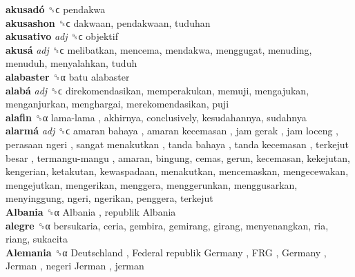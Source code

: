 \textbf{akusadó} ␝ϲ  pendakwa  \\
\textbf{akusashon} ␝ϲ  dakwaan, pendakwaan, tuduhan  \\
\textbf{akusativo} \emph{adj}  ␝ϲ  objektif  \\
\textbf{akusá} \emph{adj}  ␝ϲ  melibatkan, mencema, mendakwa, menggugat, menuding, menuduh, menyalahkan, tuduh  \\
\textbf{alabaster} ␝α   batu alabaster   \\
\textbf{alabá} \emph{adj}  ␝ϲ  direkomendasikan, memperakukan, memuji, mengajukan, menganjurkan, menghargai, merekomendasikan, puji  \\
\textbf{alafin} ␝α   lama-lama , akhirnya, conclusively, kesudahannya, sudahnya  \\
\textbf{alarmá} \emph{adj}  ␝ϲ   amaran bahaya ,  amaran kecemasan ,  jam gerak ,  jam loceng ,  perasaan ngeri ,  sangat menakutkan ,  tanda bahaya ,  tanda kecemasan ,  terkejut besar ,  termangu-mangu , amaran, bingung, cemas, gerun, kecemasan, kekejutan, kengerian, ketakutan, kewaspadaan, menakutkan, mencemaskan, mengecewakan, mengejutkan, mengerikan, menggera, menggerunkan, menggusarkan, menyinggung, ngeri, ngerikan, penggera, terkejut  \\
\textbf{Albania} ␝α   Albania ,  republik Albania   \\
\textbf{alegre} ␝α  bersukaria, ceria, gembira, gemirang, girang, menyenangkan, ria, riang, sukacita  \\
\textbf{Alemania} ␝α   Deutschland ,  Federal republik Germany ,  FRG ,  Germany ,  Jerman ,  negeri Jerman , jerman  \\
